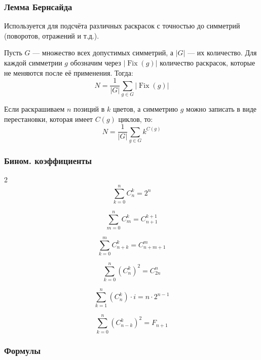 \subsubsection{Лемма Бернсайда}

Используется для подсчёта различных раскрасок с точностью до симметрий (поворотов, отражений и т.д.).

Пусть $G$ — множество всех допустимых симметрий, а $|G|$ --- их количество. Для каждой симметрии $g$ обозначим через
$|\operatorname{Fix}(g)|$ количество раскрасок, которые не меняются после её применения. Тогда:
\[
N = \frac{1}{|G|}\sum_{g \in G} |\operatorname{Fix}(g)|
\]

Если раскрашиваем $n$ позиций в $k$ цветов, а симметрию $g$ можно записать в виде перестановки, которая имеет $C(g)$ циклов, то:
\[
N = \frac{1}{|G|}\sum_{g \in G} k^{C(g)}
\]

\subsubsection {Бином. коэффициенты}

\begin{minipage}{0.48\textwidth}
	\begin{multicols}{2}
		$$\sum_{k=0}^{n} C_{n}^{k} = 2^n$$
		
		$$\sum_{m=0}^{n} C_{m}^{k} = C_{n+1}^{k+1}$$

		$$\sum_{k=0}^{m} C_{n+k}^{k} = C_{n+m+1}^{m}$$
		
		$$\sum_{k=0}^{n} (C_{n}^{k})^2 = C_{2n}^{n}$$

		$$\sum_{k=1}^{n} (C_{n}^{k}) \cdot i = n \cdot 2 ^ {n-1}$$

		$$\sum_{k=0}^{n} (C_{n-k}^{k})^2 = F_{n+1}$$
	\end{multicols}
\end{minipage}

\subsubsection {Формулы}

